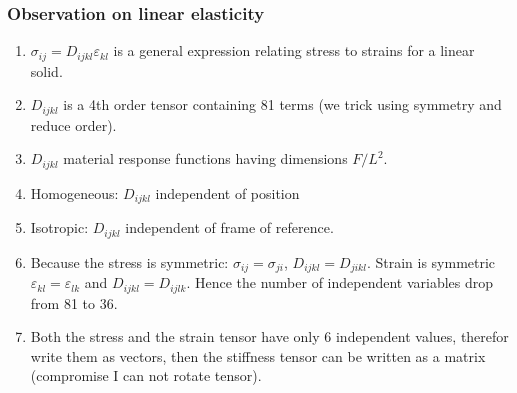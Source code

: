 \documentclass[notes]{beamer}
\begin{document}
\begin{frame}
\frametitle{Observation on linear elasticity}
	\begin{enumerate}
		\item $\sigma_{ij} = D_{ijkl} \varepsilon_{kl}$ is a general expression relating stress to strains for a linear solid.
		\item $D_{ijkl}$ is a 4th order tensor containing 81 terms (we trick using symmetry and reduce order).
		\item $D_{ijkl}$ material response functions having dimensions $F/L^2$.
		\item Homogeneous: $D_{ijkl}$ independent of position
		\item Isotropic: $D_{ijkl}$ independent of frame of reference.
		\item Because the stress is symmetric: $\sigma_{ij} = \sigma_{ji}$, $D_{ijkl} = D_{jikl}$. Strain is symmetric $\varepsilon_{kl} = \varepsilon_{lk}$ and $D_{ijkl} = D_{ijlk}$. Hence the number of independent variables drop from 81 to 36. 
		\item Both the stress and the strain tensor have only 6 independent values, therefor write them as vectors, then the stiffness tensor can be written as a matrix (compromise I can not rotate tensor).
	\end{enumerate}
\end{frame}
\end{document}
